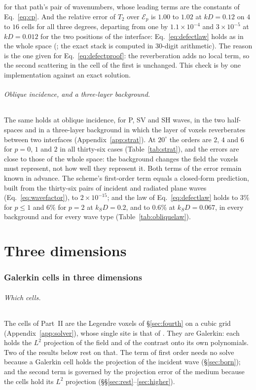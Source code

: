 \documentclass[11pt,a4paper]{article}
\begin{document}
for that path's pair of wavenumbers, whose leading terms are the constants of Eq.~\eqref{eq:cp}. And
the relative error of $T_2$ over $\mathcal{E}_p$ is $1.00$ to $1.02$ at $kD=0.12$ on $4$ to $16$ cells
for all three degrees, departing from one by $1.1\times10^{-4}$ and $3\times10^{-5}$ at $kD=0.012$ for
the two positions of the interface: Eq.~\eqref{eq:defectlaw} holds as in the whole space
(; the exact stack is computed in $30$-digit
arithmetic). The reason is the one given for Eq.~\eqref{eq:defectproof}: the reverberation adds no
local term, so the second scattering in the cell of the first is unchanged. This check is by one
implementation against an exact solution.

\paragraph{Oblique incidence, and a three-layer background.} The same holds at oblique incidence, for
P, SV and SH waves, in the two half-spaces and in a three-layer background in which the layer of voxels
reverberates between two interfaces (Appendix~\ref{app:strat}). At $20^\circ$ the orders are $2$, $4$
and $6$ for $p=0$, $1$ and $2$ in all thirty-six cases (Table~\ref{tab:strat}), and the errors are
close to those of the whole space: the background changes the field the voxels must represent, not how
well they represent it. Both terms of the error remain known in advance. The scheme's first-order term
equals a closed-form prediction, built from the thirty-six pairs of incident and radiated plane waves
(Eq.~\eqref{eq:wavefactor}), to $2\times10^{-15}$; and the law of Eq.~\eqref{eq:defectlaw} holds to
$3\%$ for $p\le1$ and $6\%$ for $p=2$ at $k_SD=0.2$, and to $0.6\%$ at $k_SD=0.067$, in every
background and for every wave type (Table~\ref{tab:obliquelaw}).

\FloatBarrier

\part{Three dimensions}

\section{Galerkin cells in three dimensions}\label{sec:cells3d}

\paragraph{Which cells.} The cells of Part~II are the Legendre voxels of \S\ref{sec:fourth} on a cubic grid
(Appendix~\ref{app:solver}), whose single site is that of \citet{NestorLegendre2026}. They are Galerkin:
each holds the $L^2$ projection of the field and of the contrast onto its own polynomials. Two of the
results below rest on that. The term of first order needs no solve because a Galerkin cell holds the
projection of the incident wave (\S\ref{sec:born}); and the second term is governed by the projection
error of the medium because the cells hold its $L^2$ projection (\S\S\ref{sec:rest}--\ref{sec:higher}).
\end{document}
